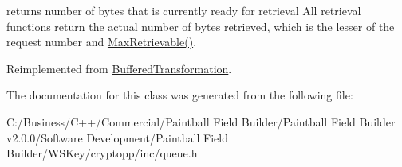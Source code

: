 returns number of bytes that is currently ready for retrieval All retrieval functions return the actual number of bytes retrieved, which is the lesser of the request number and \hyperlink{class_byte_queue_1_1_walker_a3c69dce9261b937f265bae9e8c26479f}{MaxRetrievable()}. 

Reimplemented from \hyperlink{class_buffered_transformation_adf6654e3996270394552d67d2fda95d7}{BufferedTransformation}.

The documentation for this class was generated from the following file:\begin{DoxyCompactItemize}
\item 
C:/Business/C++/Commercial/Paintball Field Builder/Paintball Field Builder v2.0.0/Software Development/Paintball Field Builder/WSKey/cryptopp/inc/queue.h\end{DoxyCompactItemize}

